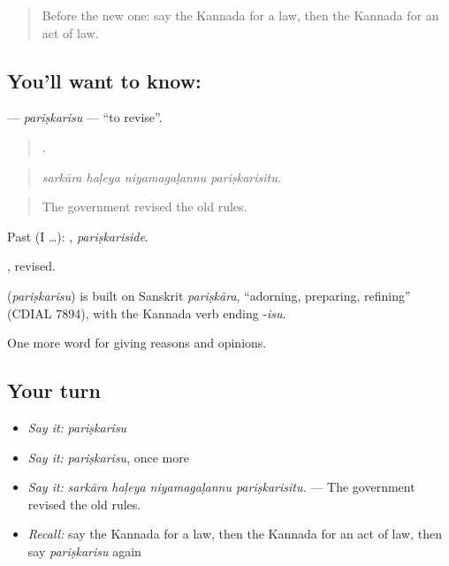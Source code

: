 \label{lesson:KA-C390-pariskarisu}



\begin{quote}
Before the new one: say the Kannada for a law, then the Kannada for an act of law.
\end{quote}

\subsection*{You'll want to know: }
\textbf{} — \emph{pariṣkarisu} — \textquotedblleft{}to revise\textquotedblright{}.

\begin{quote}
   .
\end{quote}

\begin{quote}
\emph{sarkāra haḷeya niyamagaḷannu pariṣkarisitu.}
\end{quote}

\begin{quote}
The government revised the old rules.
\end{quote}

Past (I …): , \emph{pariṣkariside}.

, revised.

\begin{cousinweb}
\textbf{} (\emph{pariṣkarisu}) is built on Sanskrit \emph{pariṣkāra}, \textquotedblleft{}adorning, preparing, refining\textquotedblright{} (CDIAL 7894), with the Kannada verb ending -\emph{isu}.
\end{cousinweb}

\begin{grammarlens}[title={What you've built}]
One more word for giving reasons and opinions.
\end{grammarlens}

\subsection*{Your turn}
\begin{itemize}
\raggedright
  \item \emph{Say it:} \emph{pariṣkarisu}
  \item \emph{Say it:} \emph{pariṣkarisu}, once more
  \item \emph{Say it:} \emph{sarkāra haḷeya niyamagaḷannu pariṣkarisitu.} — The government revised the old rules.
  \item \emph{Recall:} say the Kannada for a law, then the Kannada for an act of law, then say \emph{pariṣkarisu} again
\end{itemize}

